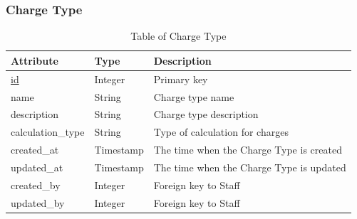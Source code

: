 \subsubsection{Charge Type}
\begin{table}[H]
    \centering
    \begin{tabular}{|p{3cm}|p{2cm}|p{\dimexpr\textwidth-6.8cm}|} %
        \hline
        \rowcolor[HTML]{C0C0C0} 
        \textbf{Attribute} & \textbf{Type} & \textbf{Description} \\ \hline
        \underline{id} & Integer & Primary key \\ \hline
        name & String & Charge type name \\ \hline
        description & String & Charge type description \\ \hline
        calculation\_type & String & Type of calculation for charges \\ \hline
        created\_at & Timestamp & The time when the Charge Type is created \\ \hline
        updated\_at & Timestamp & The time when the Charge Type is updated \\ \hline
        created\_by & Integer & Foreign key to Staff \\ \hline
        updated\_by & Integer & Foreign key to Staff \\ \hline
    \end{tabular}
    \caption{Table of Charge Type}
    \label{tab:charge-type-table}
\end{table}

